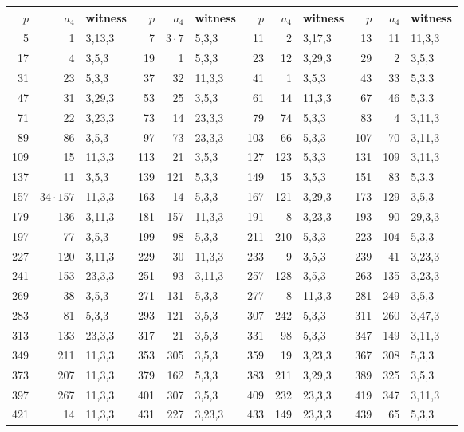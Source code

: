 \setlength{\tabcolsep}{3pt}
\begin{tabular}{rrl|rrl|rrl|rrl}
\hline
$p$ & $a_4$ & witness & $p$ & $a_4$ & witness & $p$ & $a_4$ & witness & $p$ & $a_4$ & witness\\ \hline
5 & 1 & 3,13,3 & 7 & $3\cdot7$ & 5,3,3 & 11 & 2 & 3,17,3 & 13 & 11 & 11,3,3\\
17 & 4 & 3,5,3 & 19 & 1 & 5,3,3 & 23 & 12 & 3,29,3 & 29 & 2 & 3,5,3\\
31 & 23 & 5,3,3 & 37 & 32 & 11,3,3 & 41 & 1 & 3,5,3 & 43 & 33 & 5,3,3\\
47 & 31 & 3,29,3 & 53 & 25 & 3,5,3 & 61 & 14 & 11,3,3 & 67 & 46 & 5,3,3\\
71 & 22 & 3,23,3 & 73 & 14 & 23,3,3 & 79 & 74 & 5,3,3 & 83 & 4 & 3,11,3\\
89 & 86 & 3,5,3 & 97 & 73 & 23,3,3 & 103 & 66 & 5,3,3 & 107 & 70 & 3,11,3\\
109 & 15 & 11,3,3 & 113 & 21 & 3,5,3 & 127 & 123 & 5,3,3 & 131 & 109 & 3,11,3\\
137 & 11 & 3,5,3 & 139 & 121 & 5,3,3 & 149 & 15 & 3,5,3 & 151 & 83 & 5,3,3\\
157 & $34\cdot157$ & 11,3,3 & 163 & 14 & 5,3,3 & 167 & 121 & 3,29,3 & 173 & 129 & 3,5,3\\
179 & 136 & 3,11,3 & 181 & 157 & 11,3,3 & 191 & 8 & 3,23,3 & 193 & 90 & 29,3,3\\
197 & 77 & 3,5,3 & 199 & 98 & 5,3,3 & 211 & 210 & 5,3,3 & 223 & 104 & 5,3,3\\
227 & 120 & 3,11,3 & 229 & 30 & 11,3,3 & 233 & 9 & 3,5,3 & 239 & 41 & 3,23,3\\
241 & 153 & 23,3,3 & 251 & 93 & 3,11,3 & 257 & 128 & 3,5,3 & 263 & 135 & 3,23,3\\
269 & 38 & 3,5,3 & 271 & 131 & 5,3,3 & 277 & 8 & 11,3,3 & 281 & 249 & 3,5,3\\
283 & 81 & 5,3,3 & 293 & 121 & 3,5,3 & 307 & 242 & 5,3,3 & 311 & 260 & 3,47,3\\
313 & 133 & 23,3,3 & 317 & 21 & 3,5,3 & 331 & 98 & 5,3,3 & 347 & 149 & 3,11,3\\
349 & 211 & 11,3,3 & 353 & 305 & 3,5,3 & 359 & 19 & 3,23,3 & 367 & 308 & 5,3,3\\
373 & 207 & 11,3,3 & 379 & 162 & 5,3,3 & 383 & 211 & 3,29,3 & 389 & 325 & 3,5,3\\
397 & 267 & 11,3,3 & 401 & 307 & 3,5,3 & 409 & 232 & 23,3,3 & 419 & 347 & 3,11,3\\
421 & 14 & 11,3,3 & 431 & 227 & 3,23,3 & 433 & 149 & 23,3,3 & 439 & 65 & 5,3,3\\

\end{tabular}
